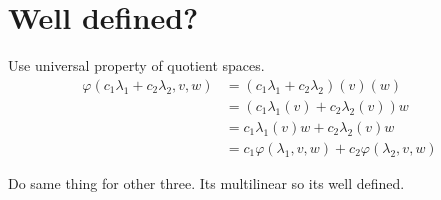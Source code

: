 \section{Well defined?}
Use universal property of quotient spaces.
\begin{align*}
    \varphi(c_1\lambda_1 + c_2\lambda_2, v, w)
    &= (c_1\lambda_1 + c_2\lambda_2)(v)(w)\\
    &= (c_1\lambda_1(v) + c_2\lambda_2(v))w\\
    &= c_1\lambda_1(v)w + c_2\lambda_2(v)w\\
    &= c_1\varphi(\lambda_1, v, w) + c_2\varphi(\lambda_2, v, w)
\end{align*}

Do same thing for other three.
Its multilinear so its well defined.